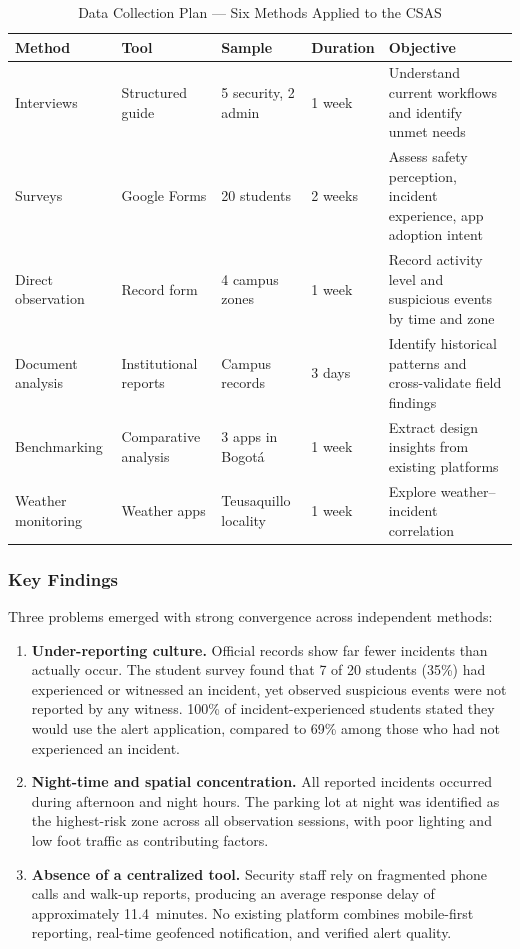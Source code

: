 \documentclass[11pt,a4paper]{article}
\begin{document}
\begin{table}[H]
\centering
\caption{Data Collection Plan --- Six Methods Applied to the CSAS}
\label{tab:datacollection}
\small
\begin{tabularx}{\textwidth}{l l l l X}
\toprule
\textbf{Method} & \textbf{Tool} & \textbf{Sample} & \textbf{Duration} & \textbf{Objective} \\
\midrule
Interviews & Structured guide & 5 security, 2 admin & 1 week & Understand current workflows and identify unmet needs \\
Surveys & Google Forms & 20 students & 2 weeks & Assess safety perception, incident experience, app adoption intent \\
Direct observation & Record form & 4 campus zones & 1 week & Record activity level and suspicious events by time and zone \\
Document analysis & Institutional reports & Campus records & 3 days & Identify historical patterns and cross-validate field findings \\
Benchmarking & Comparative analysis & 3 apps in Bogot\'a & 1 week & Extract design insights from existing platforms \\
Weather monitoring & Weather apps & Teusaquillo locality & 1 week & Explore weather--incident correlation \\
\bottomrule
\end{tabularx}
\end{table}

\subsubsection{Key Findings}

Three problems emerged with strong convergence across independent methods:

\begin{enumerate}
\item \textbf{Under-reporting culture.} Official records show far fewer incidents than actually occur. The student survey found that 7 of 20 students (35\%) had experienced or witnessed an incident, yet observed suspicious events were not reported by any witness. 100\% of incident-experienced students stated they would use the alert application, compared to 69\% among those who had not experienced an incident.

\item \textbf{Night-time and spatial concentration.} All reported incidents occurred during afternoon and night hours. The parking lot at night was identified as the highest-risk zone across all observation sessions, with poor lighting and low foot traffic as contributing factors.

\item \textbf{Absence of a centralized tool.} Security staff rely on fragmented phone calls and walk-up reports, producing an average response delay of approximately 11.4~minutes. No existing platform combines mobile-first reporting, real-time geofenced notification, and verified alert quality.
\end{enumerate}
\end{document}
